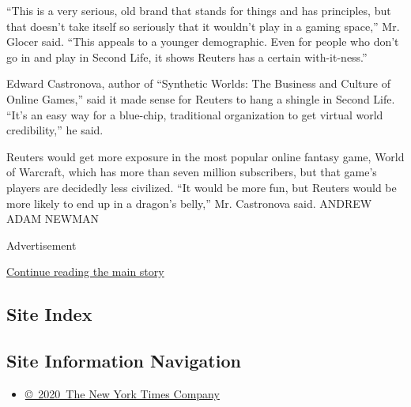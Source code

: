 ``This is a very serious, old brand that stands for things and has
principles, but that doesn't take itself so seriously that it wouldn't
play in a gaming space,'' Mr. Glocer said. ``This appeals to a younger
demographic. Even for people who don't go in and play in Second Life, it
shows Reuters has a certain with-it-ness.''

Edward Castronova, author of ``Synthetic Worlds: The Business and
Culture of Online Games,'' said it made sense for Reuters to hang a
shingle in Second Life. ``It's an easy way for a blue-chip, traditional
organization to get virtual world credibility,'' he said.

Reuters would get more exposure in the most popular online fantasy game,
World of Warcraft, which has more than seven million subscribers, but
that game's players are decidedly less civilized. ``It would be more
fun, but Reuters would be more likely to end up in a dragon's belly,''
Mr. Castronova said. ANDREW ADAM NEWMAN

Advertisement

\protect\hyperlink{after-bottom}{Continue reading the main story}

\hypertarget{site-index}{%
\subsection{Site Index}\label{site-index}}

\hypertarget{site-information-navigation}{%
\subsection{Site Information
Navigation}\label{site-information-navigation}}

\begin{itemize}
\tightlist
\item
  \href{https://help.nytimes3xbfgragh.onion/hc/en-us/articles/115014792127-Copyright-notice}{©~2020~The
  New York Times Company}
\end{itemize}

